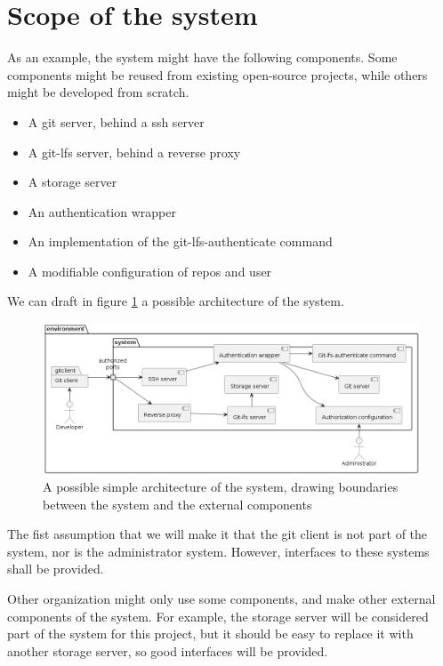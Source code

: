 \section{Scope of the system}

As an example, the system might have the following components. Some components might be reused from existing open-source projects, while others might be developed from scratch.

\begin{itemize}
    \item A git server, behind a ssh server
    \item A git-lfs server, behind a reverse proxy
    \item A storage server
    \item An authentication wrapper
    \item An implementation of the git-lfs-authenticate command
    \item A modifiable configuration of repos and user
\end{itemize}

We can draft in figure \ref{fig:architecture} a possible architecture of the system.

\begin{figure}[h]
    \centering
    \includegraphics[width=\textwidth]{iteration_01/diagrams/context.png}
    \caption{A possible simple architecture of the system, drawing boundaries between the system and the external components}
    \label{fig:architecture}
\end{figure}

The fist assumption that we will make it that the git client is not part of the system, nor is the administrator system. However, interfaces to these systems shall be provided.

Other organization might only use some components, and make other external components of the system. For example, the storage server will be considered part of the system for this project, but it should be easy to replace it with another storage server, so good interfaces will be provided.
